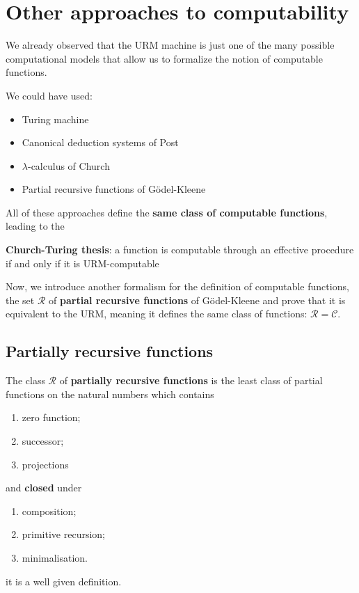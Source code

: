 \chapter{Other approaches to computability}
We already observed that the URM machine is just one of the many possible computational models that allow us to formalize the notion of computable functions.

We could have used:
\begin{itemize}
\item Turing machine
\item Canonical deduction systems of Post
\item $\lambda$-calculus of Church
\item Partial recursive functions of Gödel-Kleene
\end{itemize}

All of these approaches define the \textbf{same class of computable functions}, leading to the

\textbf{Church-Turing thesis}: a function is computable through an effective procedure 
if and only if it is URM-computable

Now, we introduce another formalism for the definition of computable functions, the set $\mathcal{R}$ of \textbf{partial recursive functions} of Gödel-Kleene and prove that it is equivalent to the URM, meaning it defines the same class of functions: $\mathcal{R} = \mathcal{C}$.

\section{Partially recursive functions}

\begin{definition}
  The class $\mathcal{R}$ of \textbf{partially recursive functions} is the least class of partial functions on the natural numbers which contains
  \begin{enumerate}[label=(\alph*)]
    \item zero function;
    \item successor;
    \item projections
    \end{enumerate}
    
    and \textbf{closed} under
    \begin{enumerate}
    \item composition;
    \item primitive recursion;
    \item minimalisation.
    \end{enumerate}
\end{definition}
it is a well given definition.

